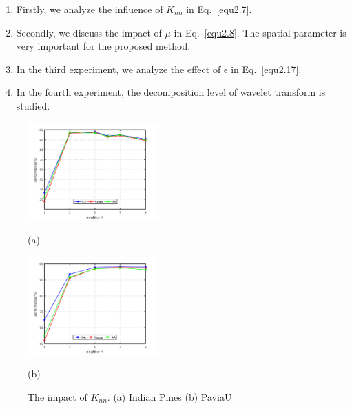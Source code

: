 \documentclass{ws-ijwmip}
\begin{document}
\begin{enumerate}
\item Firstly, we analyze the influence of $K_{nn}$ in Eq.~\ref{equ2.7}.
\item Secondly, we discuss the impact of  $\mu$ in Eq.~\ref{equ2.8}. The spatial parameter is very important for the proposed method.
\item In the third experiment, we analyze the effect of  $\epsilon$ in Eq.~\ref{equ2.17}.
\item  In the fourth experiment, the decomposition level of wavelet transform is studied.
\end{enumerate}
\begin{figure}[bh]
        \centering
        \begin{minipage}[b]{0.45\linewidth}
            \centering
            \centerline{
            \includegraphics[width=5cm ]{image/indianPines_K}}
            \centerline{(a)}
            \medskip
        \end{minipage}
        \begin{minipage}[b]{0.45\linewidth}
            \centering
            \centerline{
            \includegraphics[width=5cm ]{image/paviaU_K}}
            \centerline{(b)}
            \medskip
        \end{minipage}
        \caption{The impact of $K_{nn}$. (a) Indian Pines  (b) PaviaU}
        \label{figure3}
    \end{figure}
\end{document}
